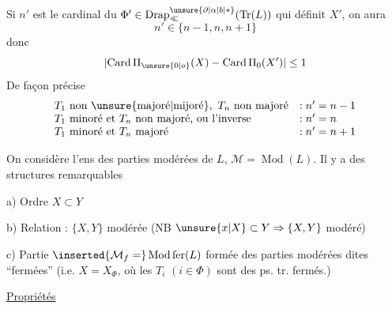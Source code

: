 
Si $n'$ est le cardinal du $ {\Phi}'\in\operatorname{Drap}_{\ll}^{\unsure{\partial|\alpha|b|*}}(\operatorname{Tr}(L))$ qui définit $X'$, on aura
\[
n'\in\{n-1,n,n+1\}
\]
donc
\[
\lvert\operatorname{Card}\Pi_{\unsure{0|o}}(X)-\operatorname{Card}\Pi_0(X')\rvert\leq 1
\]
De façon précise
\[\begin{array}{ll}
T_1\ \text{non \unsure{majoré|mijoré}},\ T_n\ \text{non majoré} &: n'=n-1\\
T_1\ \text{minoré et }T_n\ \text{non majoré, ou l'inverse} &: n'=n\\
T_1\ \text{minoré et }T_n\ \text{majoré} &: n'=n+1
\end{array}\]

On considère l'ens   des parties modérées de $L$, $\mathcal M=\operatorname{Mod}(L)$. Il y a des structures remarquables

a) Ordre \quad $X\subset Y$

b) Relation : $\{X,Y\}$ modérée \quad (NB $\unsure{x|X}\subset Y\Rightarrow\{X,Y\}$ modéré)

c) Partie $\inserted{\mathcal M_f=}\operatorname{Mod}\mathrm{fer}(L)$ formée des parties modérées dites ``fermées'' (i.e. $X=X_{\Phi}$, où les $T_i$ $(i\in\Phi)$ sont des ps. tr. fermés.)

\uline{Propriétés}
